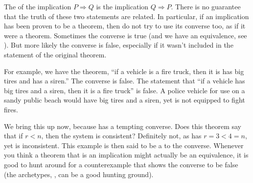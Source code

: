 \begin{para}The  of the implication $P\Rightarrow Q$ is the implication $Q\Rightarrow P$.  There is no guarantee that the truth of these two statements are related.  In particular, if an implication has been proven to be a theorem, then do not try to use its converse too, as if it were a theorem.  Sometimes the converse is true (and we have an equivalence, see ).  But more likely the converse is false, especially if it wasn't included in the statement of the original theorem.\end{para}
%
\begin{para}For example, we have the theorem, ``if a vehicle is a fire truck, then it is has big tires and has a siren.''  The converse is false.  The statement that ``if a vehicle has big tires and a siren, then it is a fire truck'' is false.  A police vehicle for use on a sandy public beach would have big tires and a siren, yet is not equipped to fight fires.\end{para}
%
\begin{para}We bring this up now, because  has a tempting converse.  Does this theorem say that if
$r<n$,
then the system is consistent?  Definitely not, as  has
$r=3<4=n$,
yet is inconsistent.  This example is then said to be a  to the converse.  Whenever you think a theorem that is an implication might actually be an equivalence, it is good to hunt around for a counterexample that shows the converse to be false (the archetypes, , can be a good hunting ground).\end{para}
